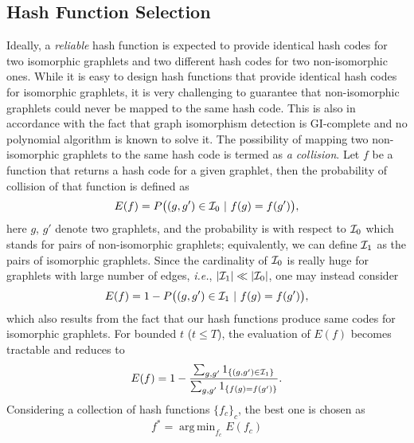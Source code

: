 \documentclass[journal]{IEEEtran}
\theoremstyle{definition}
\newcommand{\ie}{\textit{i.e.}}
\DeclareMathOperator*{\argmin}{arg\,min}
\begin{document}
\subsection{Hash Function Selection}
\label{ssec:seslct-hash-fns}
Ideally, a \emph{reliable} hash function is expected to provide identical hash codes for two isomorphic graphlets and two different hash codes for two non-isomorphic ones. While it is easy to design hash functions that provide identical hash codes for isomorphic graphlets, it is very challenging to guarantee that non-isomorphic graphlets could never be mapped to the same hash code. This is also in accordance with the fact that graph isomorphism detection is GI-complete and no polynomial algorithm is known to solve it. The possibility of mapping two non-isomorphic graphlets to the same hash code is termed as \emph{a collision}. Let $f$ be a function that returns a hash code for a given graphlet, then the probability of collision of that function is defined as
\begin{equation*}
E(f) = P\big((g,g') \in \AA_0 \ | \ f(g)= f(g') \big),
\end{equation*}
here $g$, $g'$ denote two graphlets, and the probability is with respect to $\AA_0$ which stands for pairs of non-isomorphic graphlets; equivalently, we can define $\AA_1$ as the pairs of isomorphic graphlets. Since the cardinality of $\AA_0$ is really huge for graphlets with large number of edges, \ie, $|\AA_1|\ll |\AA_0|$, one may instead consider
\begin{equation*}
E(f) = 1 - P\big((g,g') \in \AA_1 \ | \ f(g)= f(g') \big),
\end{equation*}
which also results from the fact that our hash functions produce same codes for isomorphic graphlets. For bounded $t$ ($t\leq T$), the evaluation of $E(f)$ becomes tractable and reduces to
\begin{equation*}
E(f) = 1 - \frac{\sum_{g,g'} 1_{ \{(g,g') \in \AA_1 \}}}{\sum_{g,g'} 1_{ \{f(g)=f(g')\}}}.
\end{equation*}
Considering a collection of hash functions $\{f_c\}_c$, the best one is chosen as 
\begin{equation*}
f^* = \argmin_{f_c}\allowbreak E(f_c)
\end{equation*}
\end{document}
